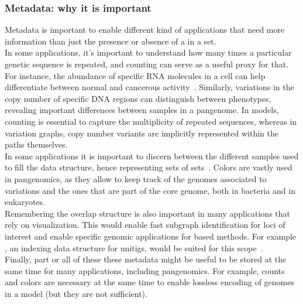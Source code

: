 \subsubsection{Metadata: why it is important}
Metadata is important to enable different kind of applications that need more information than just the presence or absence of a \kmer in a set. \\
In some applications, it's important to understand how many times a particular genetic sequence is repeated, and \kmer counting can serve as a useful proxy for that. For instance, the abundance of specific RNA molecules in a cell can help differentiate between normal and cancerous activity~\cite{kamrat,transipedia}. Similarly, variations in the copy number of specific \gls{DNA} regions can distinguish between phenotypes, revealing important differences between samples in a pangenome. In \dbg models, counting \kmers is essential to capture the multiplicity of repeated sequences, whereas in variation graphs, copy number variants are implicitly represented within the paths themselves.\\
In some applications it is important to discern between the different samples used to fill the data structure, hence representing sets of \kmer sets~\cite{metadbg}. Colors are vastly used in pangenomics, as they allow to keep track of the genomes associated to variations and the ones that are part of the core genome, both in bacteria and in eukaryotes.\\
Remembering the \dbg overlap structure is also important in many applications that rely on visualization. This would enable fast subgraph identification for loci of interest and enable specific genomic applications for \dbg based methods. For example \ssh, an indexing data structure for unitigs, would be suited for this scope~\cite{sshash}.\\
Finally, part or all of these these metadata might be useful to be stored at the same time for many applications, including pangenomics. For example, \kmer counts and colors are necessary at the same time to enable lossless encoding of genomes in a \dbg model (but they are not sufficient).

